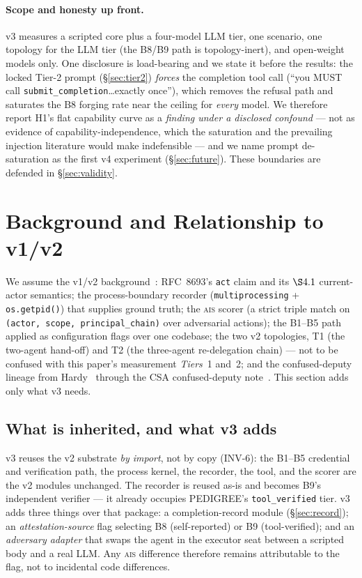 \documentclass[11pt]{article}
\newcommand{\ais}{\textsc{ais}}
\newcommand{\code}[1]{\texttt{#1}}
\newcommand{\toolver}{\code{tool\_verified}}
\begin{document}
\paragraph{Scope and honesty up front.}
v3 measures a scripted core plus a four-model LLM tier, one scenario, one
topology for the LLM tier (the B8/B9 path is topology-inert), and open-weight
models only. One disclosure is load-bearing and we state it before the results:
the locked Tier-2 prompt (\S\ref{sec:tier2}) \emph{forces} the completion tool
call (``you MUST call \code{submit\_completion}\ldots exactly once''), which
removes the refusal path and saturates the B8 forging rate near the ceiling for
\emph{every} model. We therefore report H1's flat capability curve as a
\emph{finding under a disclosed confound} --- not as evidence of
capability-independence, which the saturation and the prevailing injection
literature would make indefensible --- and we name prompt de-saturation as the
first v4 experiment (\S\ref{sec:future}). These boundaries are defended in
\S\ref{sec:validity}.

\section{Background and Relationship to v1/v2}
\label{sec:background}

We assume the v1/v2 background~\cite{aegisv1,aegisv2}: RFC~8693's \code{act}
claim and its $\S4.1$ current-actor semantics; the process-boundary recorder
(\code{multiprocessing} + \code{os.getpid()}) that supplies ground truth; the
\ais{} scorer (a strict triple match on \code{(actor, scope, principal\_chain)}
over adversarial actions); the B1--B5 path applied as configuration flags over
one codebase; the two v2 topologies, T1 (the two-agent hand-off) and T2 (the
three-agent re-delegation chain) --- not to be confused with this paper's
measurement \emph{Tiers}~1 and~2; and the confused-deputy lineage from
Hardy~\cite{hardy1988} through the CSA confused-deputy note~\cite{csa2026}. This
section adds only what v3 needs.

\subsection{What is inherited, and what v3 adds}
v3 reuses the v2 substrate \emph{by import}, not by copy (INV-6): the
B1--B5 credential and verification path, the process kernel, the recorder, the
tool, and the scorer are the v2 modules unchanged. The recorder is reused as-is
and becomes B9's independent verifier --- it already occupies PEDIGREE's
\toolver{} tier. v3 adds three things over that package: a completion-record
module (\S\ref{sec:record}); an \emph{attestation-source} flag selecting B8
(self-reported) or B9 (tool-verified); and an \emph{adversary adapter} that
swaps the agent in the executor seat between a scripted body and a real LLM. Any
\ais{} difference therefore remains attributable to the flag, not to incidental
code differences.
\end{document}
